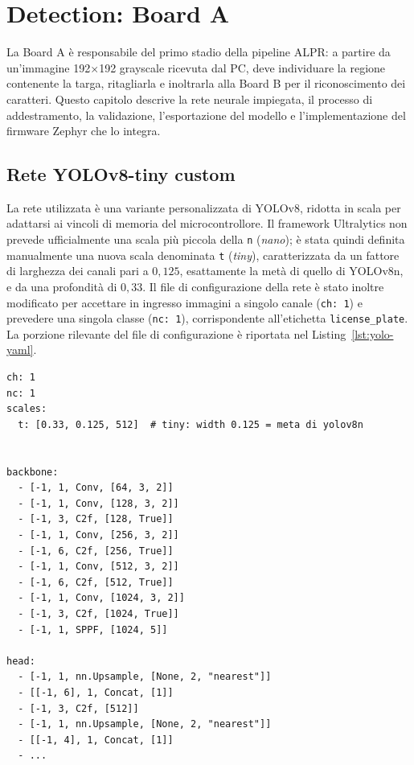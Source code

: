 \chapter{Detection: Board A}
\label{cap:detection}

La Board A è responsabile del primo stadio della pipeline ALPR: a partire da un'immagine 192$\times$192 grayscale ricevuta dal PC, deve individuare la regione contenente la targa, ritagliarla e inoltrarla alla Board B per il riconoscimento dei caratteri. Questo capitolo descrive la rete neurale impiegata, il processo di addestramento, la validazione, l'esportazione del modello e l'implementazione del firmware Zephyr che lo integra.

\section{Rete YOLOv8-tiny custom}
\label{sec:yolov8t}

La rete utilizzata è una variante personalizzata di YOLOv8, ridotta in scala per adattarsi ai vincoli di memoria del microcontrollore. Il framework Ultralytics non prevede ufficialmente una scala più piccola della \texttt{n} (\textit{nano}); è stata quindi definita manualmente una nuova scala denominata \texttt{t} (\textit{tiny}), caratterizzata da un fattore di larghezza dei canali pari a $0{,}125$, esattamente la metà di quello di YOLOv8n, e da una profondità di $0{,}33$. Il file di configurazione della rete è stato inoltre modificato per accettare in ingresso immagini a singolo canale (\texttt{ch:~1}) e prevedere una singola classe (\texttt{nc:~1}), corrispondente all'etichetta \texttt{license\_plate}. La porzione rilevante del file di configurazione è riportata nel Listing~\ref{lst:yolo-yaml}.

\begin{lstlisting}[style=stileYAML, caption={Configurazione \texttt{yolov8t.yaml} che definisce la scala \texttt{t} a singolo canale e singola classe.}, label={lst:yolo-yaml}]
ch: 1
nc: 1
scales:
  t: [0.33, 0.125, 512]  # tiny: width 0.125 = meta di yolov8n


backbone:
  - [-1, 1, Conv, [64, 3, 2]]
  - [-1, 1, Conv, [128, 3, 2]]
  - [-1, 3, C2f, [128, True]]
  - [-1, 1, Conv, [256, 3, 2]]
  - [-1, 6, C2f, [256, True]]
  - [-1, 1, Conv, [512, 3, 2]]
  - [-1, 6, C2f, [512, True]]
  - [-1, 1, Conv, [1024, 3, 2]]
  - [-1, 3, C2f, [1024, True]]
  - [-1, 1, SPPF, [1024, 5]]

head:
  - [-1, 1, nn.Upsample, [None, 2, "nearest"]]
  - [[-1, 6], 1, Concat, [1]]
  - [-1, 3, C2f, [512]]
  - [-1, 1, nn.Upsample, [None, 2, "nearest"]]
  - [[-1, 4], 1, Concat, [1]]
  - ...
\end{lstlisting}

